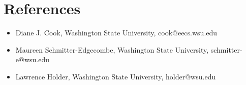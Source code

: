 \AOCLine
\section*{References}

\begin{itemize}

	\item{Diane J. Cook, Washington State University, cook@eecs.wsu.edu}


	\item{Maureen Schmitter-Edgecombe, Washington State University, schmitter-e@wsu.edu}

	\item{Lawrence Holder, Washington State University, holder@wsu.edu}
\end{itemize}
